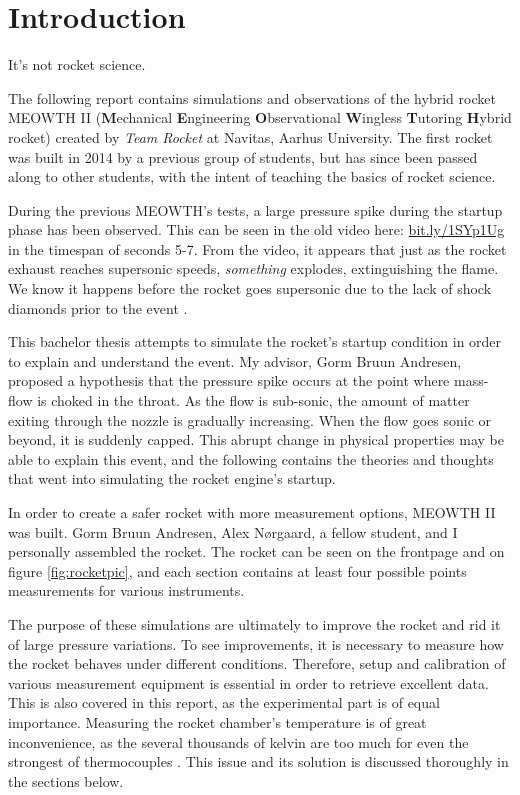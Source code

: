 \chapter{Introduction}

It's not rocket science.

The following report contains simulations and observations of the hybrid rocket MEOWTH II (\textbf{M}echanical \textbf{E}ngineering \textbf{O}bservational \textbf{W}ingless \textbf{T}utoring \textbf{H}ybrid rocket) created by \emph{Team Rocket} \cite{bulba} at Navitas, Aarhus University. The first rocket was built in 2014 by a previous group of students, but has since been passed along to other students, with the intent of teaching the basics of rocket science.


During the previous MEOWTH's tests, a large pressure spike during the startup phase has been observed. This can be seen in the old video here: \url{bit.ly/1SYp1Ug} in the timespan of seconds 5-7. From the video, it appears that just as the rocket exhaust reaches supersonic speeds, \emph{something} explodes, extinguishing the flame. We know it happens before the rocket goes supersonic due to the lack of shock diamonds prior to the event \cite{rockProp}.


This bachelor thesis attempts to simulate the rocket's startup condition in order to explain and understand the event. My advisor, Gorm Bruun Andresen, proposed a hypothesis that the pressure spike occurs at the point where mass-flow is choked in the throat. As the flow is sub-sonic, the amount of matter exiting through the nozzle is gradually increasing. When the flow goes sonic or beyond, it is suddenly capped. This abrupt change in physical properties may be able to explain this event, and the following contains the theories and thoughts that went into simulating the rocket engine's startup.


In order to create a safer rocket with more measurement options, MEOWTH II was built. Gorm Bruun Andresen, Alex Nørgaard, a fellow student, and I personally assembled the rocket. The rocket can be seen on the frontpage and on figure \ref{fig:rocketpic}, and each section contains at least four possible points measurements for various instruments.


The purpose of these simulations are ultimately to improve the rocket and rid it of large pressure variations. To see improvements, it is necessary to measure how the rocket behaves under different conditions. Therefore, setup and calibration of various measurement equipment is essential in order to retrieve excellent data. This is also covered in this report, as the experimental part is of equal importance. Measuring the rocket chamber's temperature is of great inconvenience, as the several thousands of kelvin are too much for even the strongest of thermocouples \cite{thermocoup}. This issue and its solution is discussed thoroughly in the sections below.

